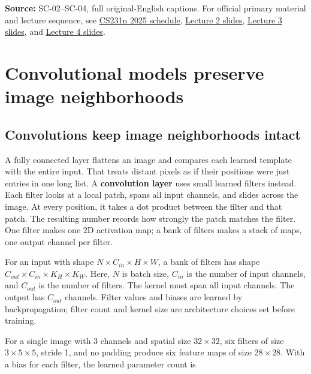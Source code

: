 \textbf{Source:} SC-02--SC-04, full original-English captions. For official primary material and lecture sequence, see \href{https://cs231n.stanford.edu/2025/schedule.html}{CS231n 2025 schedule}, \href{https://cs231n.stanford.edu/slides/2025/lecture_2.pdf}{Lecture 2 slides}, \href{https://cs231n.stanford.edu/slides/2025/lecture_3.pdf}{Lecture 3 slides}, and \href{https://cs231n.stanford.edu/slides/2025/lecture_4.pdf}{Lecture 4 slides}.

\section{Convolutional models preserve image neighborhoods}\label{04-visual-computing-ii-ch031-convolutional-models-preserve-image-neighborhoods}

\hypertarget{04-visual-computing-ii-ch031-convolutional-models-preserve-image-neighborhoods}{}

\subsection{Convolutions keep image neighborhoods intact}\label{04-visual-computing-ii-ch031-convolutions-keep-image-neighborhoods-intact}

\hypertarget{04-visual-computing-ii-ch031-convolutions-keep-image-neighborhoods-intact}{}

A fully connected layer flattens an image and compares each learned template with the entire input. That treats distant pixels as if their positions were just entries in one long list. A \textbf{convolution layer} uses small learned filters instead. Each filter looks at a local patch, spans all input channels, and slides across the image. At every position, it takes a dot product between the filter and that patch. The resulting number records how strongly the patch matches the filter. One filter makes one 2D activation map; a bank of filters makes a stack of maps, one output channel per filter.

For an input with shape \(N\times C_{in}\times H\times W\), a bank of filters has shape \(C_{out}\times C_{in}\times K_H\times K_W\). Here, \(N\) is batch size, \(C_{in}\) is the number of input channels, and \(C_{out}\) is the number of filters. The kernel must span all input channels. The output has \(C_{out}\) channels. Filter values and biases are learned by backpropagation; filter count and kernel size are architecture choices set before training.

For a single image with 3 channels and spatial size \(32\times32\), six filters of size \(3\times5\times5\), stride 1, and no padding produce six feature maps of size \(28\times28\). With a bias for each filter, the learned parameter count is

